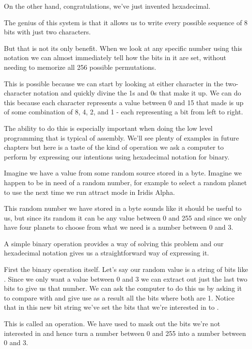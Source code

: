 On the other hand, congratulations, we've just invented hexadecimal.

The genius of this system is that it allows us to write every possible
sequence of 8 bits with just two characters. 

But that is not its only benefit. When we look at any specific number
using this notation we can almost immediately tell how the bits in it
are set, without needing to memorize all 256 possible permutations.

This is possible because we can start by looking at either character
in the two-character notation and quickly divine the 1s and 0s that
make it up. We can do this because each character represents a value
between 0 and 15 that made is up of some combination of 8, 4, 2, and
1 - each representing a bit from left to right.

The ability to do this is especially important when doing the low
level programming that is typical of assembly. We'll see plenty of
examples in future chapters but here is a taste of the kind of operation
we ask a computer to perform by expressing our intentions using 
hexadecimal notation for binary.

Imagine we have a value from some random source stored in a byte. Imagine
we happen to be in need of a random number, for example to select a random
planet to use the next time we run attract mode in Iridis Alpha.

This random number we have stored in a byte sounds like it should be useful to us, but since its
random it can be any value between 0 and 255 and since we only have four
planets to choose from what we need is a number between 0 and 3.

A simple binary operation provides a way of solving this problem and 
our hexadecimal notation gives us a straightforward way of expressing it.

First the binary operation itself. Let's say our random value is a string of bits
like . Since we only want a value between 0 and 3 we can
extract out just the last two bits to give us that number. We can ask the
computer to do this us by asking it to compare  with 
and give use as a result all the bits where both are 1. Notice that in this new 
bit string we've set the bits that we're interested in to .

This is called an  operation. We have used  to mask
out the bits we're not interested in and hence turn a number between 0 and 255
into a number between 0 and 3.









